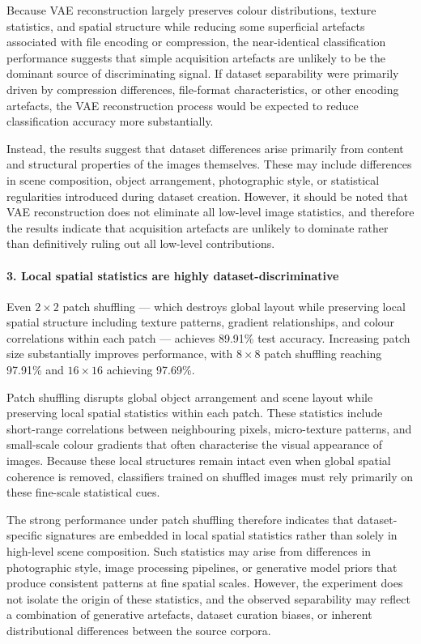Because VAE reconstruction largely preserves colour distributions, texture statistics, and spatial structure while reducing some superficial artefacts associated with file encoding or compression, the near-identical classification performance suggests that simple acquisition artefacts are unlikely to be the dominant source of discriminating signal. If dataset separability were primarily driven by compression differences, file-format characteristics, or other encoding artefacts, the VAE reconstruction process would be expected to reduce classification accuracy more substantially.

Instead, the results suggest that dataset differences arise primarily from content and structural properties of the images themselves. These may include differences in scene composition, object arrangement, photographic style, or statistical regularities introduced during dataset creation. However, it should be noted that VAE reconstruction does not eliminate all low-level image statistics, and therefore the results indicate that acquisition artefacts are unlikely to dominate rather than definitively ruling out all low-level contributions.

\paragraph{3. Local spatial statistics are highly dataset-discriminative}

Even $2\times2$ patch shuffling — which destroys global layout while preserving local spatial structure including texture patterns, gradient relationships, and colour correlations within each patch — achieves 89.91\% test accuracy. Increasing patch size substantially improves performance, with $8\times8$ patch shuffling reaching 97.91\% and $16\times16$ achieving 97.69\%.

Patch shuffling disrupts global object arrangement and scene layout while preserving local spatial statistics within each patch. These statistics include short-range correlations between neighbouring pixels, micro-texture patterns, and small-scale colour gradients that often characterise the visual appearance of images. Because these local structures remain intact even when global spatial coherence is removed, classifiers trained on shuffled images must rely primarily on these fine-scale statistical cues.

The strong performance under patch shuffling therefore indicates that dataset-specific signatures are embedded in local spatial statistics rather than solely in high-level scene composition. Such statistics may arise from differences in photographic style, image processing pipelines, or generative model priors that produce consistent patterns at fine spatial scales. However, the experiment does not isolate the origin of these statistics, and the observed separability may reflect a combination of generative artefacts, dataset curation biases, or inherent distributional differences between the source corpora.

